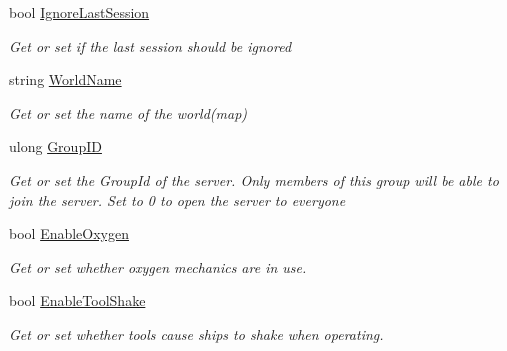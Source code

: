 \begin{DoxyCompactItemize}
bool \hyperlink{class_s_e_mod_a_p_i_1_1_a_p_i_1_1_definitions_1_1_dedicated_config_definition_af1a08be34d6381f38f04c429780215fe}{Ignore\+Last\+Session}
\begin{DoxyCompactList}\small\item\em Get or set if the last session should be ignored \end{DoxyCompactList}\item 
string \hyperlink{class_s_e_mod_a_p_i_1_1_a_p_i_1_1_definitions_1_1_dedicated_config_definition_a0e758b25165b20c8a125634c61070710}{World\+Name}
\begin{DoxyCompactList}\small\item\em Get or set the name of the world(map) \end{DoxyCompactList}\item 
ulong \hyperlink{class_s_e_mod_a_p_i_1_1_a_p_i_1_1_definitions_1_1_dedicated_config_definition_a540f7d884501a817330a71c70b126438}{Group\+I\+D}
\begin{DoxyCompactList}\small\item\em Get or set the Group\+Id of the server. Only members of this group will be able to join the server. Set to 0 to open the server to everyone \end{DoxyCompactList}\item 
bool \hyperlink{class_s_e_mod_a_p_i_1_1_a_p_i_1_1_definitions_1_1_dedicated_config_definition_aca803d608f696f5f981fcc1dbd438139}{Enable\+Oxygen}
\begin{DoxyCompactList}\small\item\em Get or set whether oxygen mechanics are in use. \end{DoxyCompactList}\item 
bool \hyperlink{class_s_e_mod_a_p_i_1_1_a_p_i_1_1_definitions_1_1_dedicated_config_definition_a28da55c57e0e883185b1cddce38f8990}{Enable\+Tool\+Shake}
\begin{DoxyCompactList}\small\item\em Get or set whether tools cause ships to shake when operating. \end{DoxyCompactList}\item 

\end{DoxyCompactItemize}

